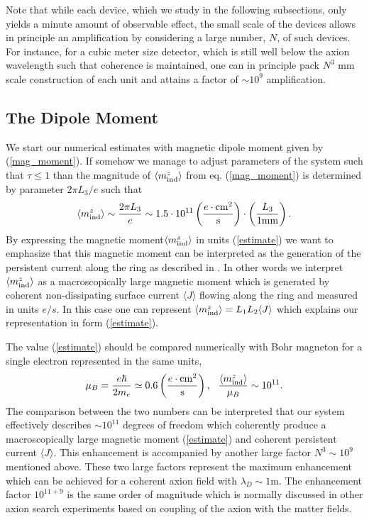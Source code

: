 \documentclass[ twocolumn,aps,prd,   
               preprintnumbers,numbers,sort&compress,nofootinbib,
                            showpacs,superscriptaddress,
               colorlinks,
               linkcolor=blue,   
               citecolor=blue]{revtex4-1}   \newcommand{\exclude}[1]{}
\newcommand{\be}{\begin{eqnarray}}
\newcommand{\ee}{\end{eqnarray}}
\def\la{\langle}
\def\ra{\rangle}
\begin{document}
Note that while each device, which we study in the following subsections, only yields a minute amount of observable effect, the small scale of the devices allows in principle an amplification by considering a large number, $N$, of such  devices. For instance, for a cubic meter size detector, which is still well below the axion wavelength such that coherence is maintained, one can in principle pack $N^3$ mm scale construction of each unit and attains a factor of $\sim 10^9$ amplification.

\subsection{ The Dipole Moment}\label{subsec:dipolemeasurement}
We start our numerical estimates with magnetic dipole moment given by (\ref{mag_moment}).
If somehow we    manage to   adjust parameters of the system such that $\tau\leq 1$    than the magnitude of  $ \langle {m}^z_{\rm ind} \rangle$  from eq. (\ref{mag_moment}) is determined by parameter $2\pi L_3/e$ such that
\be
\label{estimate}
  \langle {m}^z_{\rm ind} \rangle \sim \frac{2\pi L_3}{e} \sim 1.5\cdot 10^{11} \left(\frac{e \cdot {\rm cm}^2}{{\rm s}}\right)\cdot\left(\frac{L_3}{1 {\rm mm}}\right).
\ee
By expressing  the magnetic moment$  \langle {m}^z_{\rm ind} \rangle $ in units  (\ref{estimate}) we want to emphasize 
that this   magnetic moment can be interpreted as the generation of the persistent current along the ring as described in 
\cite{Zhitnitsky:2015fpa}. In other words we interpret  $\langle {m}^z_{\rm ind} \rangle$  as a macroscopically large magnetic moment which is generated by coherent non-dissipating surface current $\la J\ra$ flowing along the ring and measured in units $e/s$. In this case one can represent  $ \langle {m}^z_{\rm ind} \rangle = L_1L_2 \la J\ra$ which explains our representation in form (\ref{estimate}).

The value (\ref{estimate}) should be compared numerically with Bohr magneton for a single electron represented in the same units, 
\be
\mu_B=\frac{e\hbar}{2 m_e}\simeq 0.6  \left(\frac{e \cdot {\rm cm}^2}{{\rm s}}\right), ~~ \frac{ \langle {m}^z_{\rm ind} \rangle}{\mu_B}\sim 10^{11} .
\ee
The comparison between the two numbers can be interpreted that our system effectively describes $\sim 10^{11}$ degrees of freedom which coherently produce a macroscopically large magnetic moment (\ref{estimate}) and coherent persistent current $\la J\ra$.
 This enhancement is accompanied by another  large factor $N^3\sim 10^9$ mentioned above. These two large factors represent  the maximum enhancement which can be achieved for a coherent axion field with $\lambda_D\sim 1$m.  The enhancement factor $10^{11+9}$ is the same order of magnitude which is normally discussed in other  axion search experiments \cite{Budker:2013hfa,Graham:2013gfa,Rybka:2014cya,Sikivie:2013laa,Beck,Stadnik:2013raa,Sikivie:2014lha,McAllister:2015zcz,Hill:2015kva,Hill:2015vma,Barbieri:2016vwg, Arvanitaki:2014dfa,Kahn:2016aff} based on coupling of the axion with the matter fields. 
\end{document}
